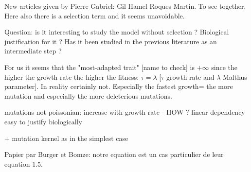 \documentclass{article}
\begin{document}
New articles given by Pierre Gabriel: Gil Hamel Roques Martin. To see together. Here also there is a selection term and it seems unavoidable. 

Question: is it interesting to study the model without selection ? Biological justification for it ? Has it been studied in the previous literature as an intermediate step ? 

For us it seems that the "most-adapted trait" [name to check] is $+\infty$ since the higher the growth rate the higher the fitness: $\tau=\lambda$ [$\tau$ growth rate and $\lambda$ Malthus parameter]. In reality certainly not. Especially the fastest growth= the more mutation and especially the more deleterious mutations.

mutations not poissonian: increase with growth rate - HOW ? linear dependency easy to justify biologically

+ mutation kernel as in the simplest case

Papier par Burger et Bomze: notre equation est un cas particulier de leur equation 1.5.
\end{document}
